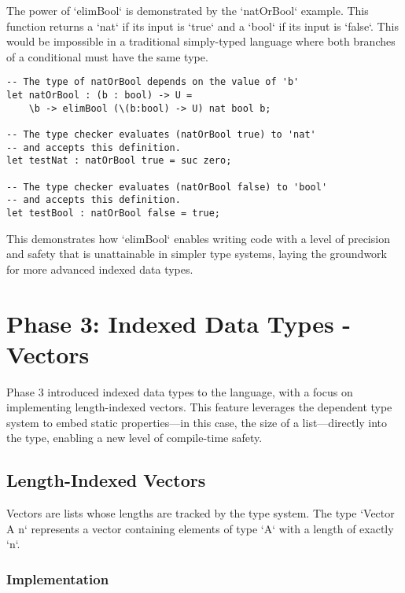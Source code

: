 The power of `elimBool` is demonstrated by the `natOrBool` example. This function returns a `nat` if its input is `true` and a `bool` if its input is `false`. This would be impossible in a traditional simply-typed language where both branches of a conditional must have the same type.
\begin{verbatim}
-- The type of natOrBool depends on the value of 'b'
let natOrBool : (b : bool) -> U =
    \b -> elimBool (\(b:bool) -> U) nat bool b;

-- The type checker evaluates (natOrBool true) to 'nat'
-- and accepts this definition.
let testNat : natOrBool true = suc zero;

-- The type checker evaluates (natOrBool false) to 'bool'
-- and accepts this definition.
let testBool : natOrBool false = true;
\end{verbatim}
This demonstrates how `elimBool` enables writing code with a level of precision and safety that is unattainable in simpler type systems, laying the groundwork for more advanced indexed data types.

\section{Phase 3: Indexed Data Types - Vectors}

Phase 3 introduced indexed data types to the language, with a focus on implementing length-indexed vectors. This feature leverages the dependent type system to embed static properties—in this case, the size of a list—directly into the type, enabling a new level of compile-time safety.

\subsection{Length-Indexed Vectors}

Vectors are lists whose lengths are tracked by the type system. The type `Vector A n` represents a vector containing elements of type `A` with a length of exactly `n`.

\subsubsection{Implementation}

